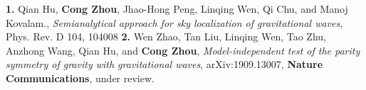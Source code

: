 
\begin{cventries}
\vspace{-0.45cm}
  \cventry
    {}
    {}
    {}
    {}
    {\textbf{1.} \textnormal{Qian Hu, \textbf{Cong Zhou}, Jhao-Hong Peng, Linqing Wen, Qi Chu, and Manoj Kovalam., \textsl{Semianalytical approach for sky localization of gravitational waves}, Phys. Rev. D 104, 104008}}
  \vspace{-0.2cm}
  \cventry
  {}
  {}
  {}
  {}
  {\textbf{2.} \textnormal{Wen Zhao, Tan Liu, Linqing Wen, Tao Zhu, Anzhong Wang, Qian Hu, and \textbf{Cong Zhou},  \textsl{Model-independent test of the parity symmetry of gravity with gravitational waves}, \textnormal{arXiv:1909.13007,} \textbf{ Nature Communications}, under review.}}
\vspace{-0.35cm}
\end{cventries}